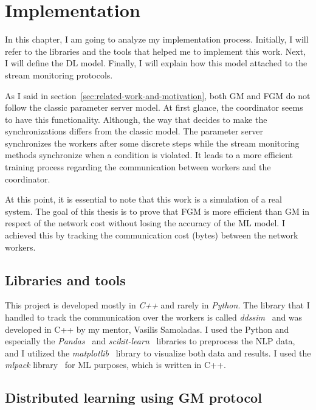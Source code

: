 \chapter{Implementation}\label{ch:implementation}

In this chapter, I am going to analyze my implementation process.
Initially, I will refer to the libraries and the tools that helped me to implement this work.
Next, I will define the DL model.
Finally, I will explain how this model attached to the stream monitoring protocols.

As I said in section~\ref{sec:related-work-and-motivation}, both GM and FGM do not follow the classic parameter server model. At first glance, the coordinator seems to have this functionality. 
Although, the way that decides to make the synchronizations differs from the classic model.
The parameter server synchronizes the workers after some discrete steps while the stream monitoring methods synchronize when a condition is violated.
It leads to a more efficient training process regarding the communication between workers and the coordinator.

At this point, it is essential to note that this work is a simulation of a real system.
The goal of this thesis is to prove that FGM is more efficient than GM in respect of the network cost without losing the accuracy of the ML model.
I achieved this by tracking the communication cost (bytes) between the network workers.


\section{Libraries and tools}\label{sec:libraries-and-tools}

This project is developed mostly in \emph{C++} and rarely in \emph{Python}.
The library that I handled to track the communication over the workers
is called \emph{ddssim}~\cite{ddssim_repo} and was developed in C++ by my mentor, Vasilis Samoladas.
I used the Python and especially the \emph{Pandas}~\cite{pandas} and \emph{scikit-learn}~\cite{sklearn} libraries to preprocess the NLP data,
and I utilized the \emph{matplotlib}~\cite{matplotlib} library to visualize both data and results.
I used the \emph{mlpack} library~\cite{mlpack2018} for ML purposes, which is written in C++.


\section{Distributed learning using GM protocol}\label{sec:distributed-learning-using-gm-protocol}

